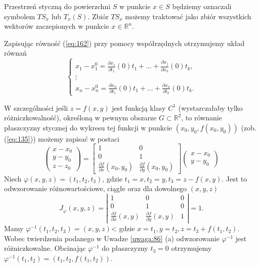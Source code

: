 \documentclass[leqno]{article}
\begin{document}
\begin{justify}
Przestrzeń styczną do powierzchni $S$ w punkcie $x \in S$ będziemy oznaczali symbolem $TS_x$ lub $T_x(S)$.
Zbiór $TS_x$ możemy traktować jako zbiór wszystkich wektorów zaczepionych w punkcie $x \in \mathbb{R}^n$.

Zapisując równość (\ref{eq:162}) przy pomocy współrzędnych otrzymujemy układ równań 
\begin{equation}\label{eq:163}
    \begin{cases}
        x_1 - x_1^0 = \frac{\partial x_1}{\partial t_1}(0)t_1 + \ldots + \frac{\partial x_j}{\partial x_k}(0)t_k, \\ 
        \vdots \\
        x_n - x_n^0 = \frac{\partial x_n}{\partial t_1}(0)t_1 + \ldots + \frac{\partial x_n}{\partial t_k}(0)t_k.
    \end{cases}
\end{equation}

W szczególności jeśli $z = f(x,y)$ jest funkcją klasy $C^1$ (wystarczałaby tylko różniczkowalność), określoną w pewnym obszarze $G \subset \mathbb{R}^2$,
to równanie płaszczyzny stycznej do wykresu tej funkcji w punkcie $(x_0, y_0, f(x_0, y_0))$ (zob. (\ref{eq:135})) możemy zapisać w postaci 
\[
    \begin{pmatrix}
        x - x_0 \\
        y - y_0 \\
        z - z_0
    \end{pmatrix}
        =
    \begin{bmatrix}
        1 & 0 \\
        0 & 1 \\
        \frac{\partial f}{\partial x}(x_0, y_0) & \frac{\partial f}{\partial y}(x_0, y_0)
    \end{bmatrix}
    \begin{pmatrix}
        x - x_0 \\
        y - y_0
    \end{pmatrix}
\]
Niech $\varphi(x,y,z) = (t_1, t_2, t_3)$, gdzie $t_1 = x, t_2 = y, t_3 = z - f(x,y)$. Jest to odwzorowanie różnowartościowe, ciągłe oraz dla dowolnego $(x,y,z)$
\[
    J_\varphi(x,y,z) = \left|
    \begin{array}{ccc}
    1 & 0 & 0 \\
    0 & 1 & 0 \\
    \frac{\partial f}{\partial x}(x,y) & \frac{\partial f}{\partial y}(x, y) & 1
    \end{array}
    \right| = 1.
\]
Mamy $\varphi^{-1}(t_1, t_2, t_3) = (x,y,z)$< gdzie $x = t_1, y = t_2, z = t_3 + f(t_1, t_2)$.
Wobec twierdzenia podanego w Uwadze \ref{uwaga:86} (a) odwzorowanie $\varphi^{-1}$ jest różniczkowalne.
Obcinając $\varphi^{-1}$ do płaszczyzny $t_3 = 0$ otrzymujemy $\varphi^{-1}(t_1, t_2) = (t_1, t_2, f(t_1, t_2))$.


\end{justify}
\end{document}
